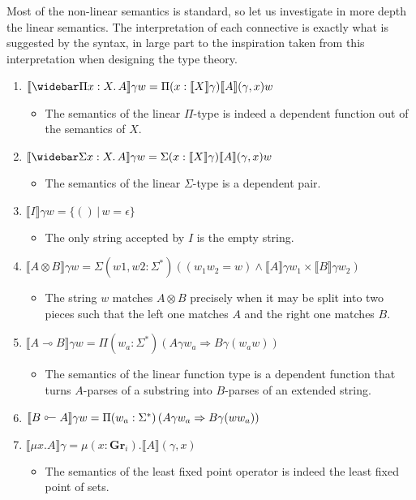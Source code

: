 \documentclass[acmsmall,screen,nonacm]{acmart}
\newcommand{\sem}[1]{\llbracket{#1}\rrbracket}
\newcommand{\lto}{\multimap}
\newcommand{\tol}{\mathrel{\rotatebox[origin=c]{180}{$\lto$}}}
\newcommand{\Gr}{\mathbf{Gr}}
\newcommand{\LinPiTy}[3]{\widebar\Pi #1 : #2.\, #3}
\newcommand{\LinSigTy}[3]{\widebar\Sigma #1 : #2.\, #3}
\newcommand{\pipe}{\,|\,}
\begin{document}
Most of the non-linear semantics is standard, so let us investigate in more
depth the linear semantics. The interpretation of each
connective is exactly what is suggested by the syntax, in
large part to the inspiration taken from this interpretation
when designing the type theory.

\begin{enumerate}
  \item $\sem{\LinPiTy x X A} \gamma w = \Pi(x:\sem{X}\gamma) \sem{A}(\gamma,x) w$
        \begin{itemize}
          \item The semantics of the linear $\Pi$-type is
                indeed a dependent function out of the
                semantics of $X$.
        \end{itemize}
  \item $\sem{\LinSigTy x X A} \gamma w = \Sigma(x:\sem{X}\gamma) \sem{A}(\gamma,x) w$
        \begin{itemize}
          \item The semantics of the linear $\Sigma$-type is
                a dependent pair.
        \end{itemize}
  \item $\sem{I} \gamma w = \{ () \pipe w = \epsilon \}$
        \begin{itemize}
          \item The only string accepted by $I$ is the empty string.
        \end{itemize}
  \item
        $\sem{A \otimes B} \gamma w = \Sigma(w1,w2:\Sigma^*) \left( (w_{1}w_{2} = w) \wedge \sem{A} \gamma w_1 \times \sem{B} \gamma w_2 \right)$
        \begin{itemize}
          \item The string $w$ matches $A \otimes B$
                precisely when it may be split into two
                pieces such that the left one matches $A$
                and the right one matches $B$.
        \end{itemize}
  \item
        $\sem{A \lto B} \gamma w = \Pi(w_a:\Sigma^*) \left( A \gamma w_a \Rightarrow B\gamma (w_aw) \right)$
        \begin{itemize}
          \item The semantics of the linear function type is
                a dependent function that turns $A$-parses
                of a substring into $B$-parses of an
                extended string.
        \end{itemize}
  \item
        $\sem{B \tol A} \gamma w = \Pi(w_a:\Sigma^*) \left( A \gamma w_a \Rightarrow B\gamma (ww_a) \right)$
  \item $\sem{\mu x. A} \gamma = \mu (x:\Gr_i). \sem{A}(\gamma,x)$
        \begin{itemize}
          \item The semantics of the least fixed point
                operator is indeed the least fixed point of sets.
        \end{itemize}
\end{enumerate}
\end{document}
